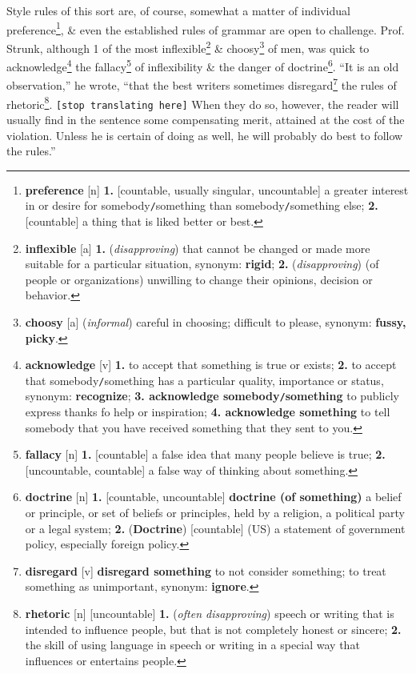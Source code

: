 \documentclass{article}
\begin{document}
Style rules of this sort are, of course, somewhat a matter of individual preference\footnote{{\bf preference} [n] {\bf 1.} [countable, usually singular, uncountable] a greater interest in or desire for somebody{\tt/}something than somebody{\tt/}something else; {\bf 2.} [countable] a thing that is liked better or best.}, \& even the established rules of grammar are open to challenge. Prof. Strunk, although 1 of the most inflexible\footnote{{\bf inflexible} [a] {\bf 1.} ({\it disapproving}) that cannot be changed or made more suitable for a particular situation, {\sc synonym}: {\bf rigid}; {\bf 2.} ({\it disapproving}) (of people or organizations) unwilling to change their opinions, decision or behavior.} \& choosy\footnote{{\bf choosy} [a] ({\it informal}) careful in choosing; difficult to please, {\sc synonym}: {\bf fussy, picky}.} of men, was quick to acknowledge\footnote{{\bf acknowledge} [v]  {\bf 1.} to accept that something is true or exists; {\bf 2.} to accept that somebody{\tt/}something has a particular quality, importance or status, {\sc synonym}: {\bf recognize}; {\bf 3. acknowledge somebody{\tt/}something} to publicly express thanks fo help or inspiration; {\bf 4. acknowledge something} to tell somebody that you have received something that they sent to you.} the fallacy\footnote{{\bf fallacy} [n] {\bf 1.} [countable] a false idea that many people believe is true; {\bf 2.} [uncountable, countable] a false way of thinking about something.} of inflexibility \& the danger of doctrine\footnote{{\bf doctrine} [n] {\bf 1.} [countable, uncountable] {\bf doctrine (of something)} a belief or principle, or set of beliefs or principles, held by a religion, a political party or a legal system; {\bf 2.} ({\bf Doctrine}) [countable] (US) a statement of government policy, especially foreign policy.}. ``It is an old observation,'' he wrote, ``that the best writers sometimes disregard\footnote{{\bf disregard} [v] {\bf disregard something} to not consider something; to treat something as unimportant, {\sc synonym}: {\bf ignore}.} the rules of rhetoric\footnote{{\bf rhetoric} [n] [uncountable] {\bf 1.} ({\it often disapproving}) speech or writing that is intended to influence people, but that is not completely honest or sincere; {\bf 2.} the skill of using language in speech or writing in a special way that influences or entertains people.}. \texttt{[stop translating here]} When they do so, however, the reader will usually find in the sentence some compensating merit, attained at the cost of the violation. Unless he is certain of doing as well, he will probably do best to follow the rules.''
\end{document}
